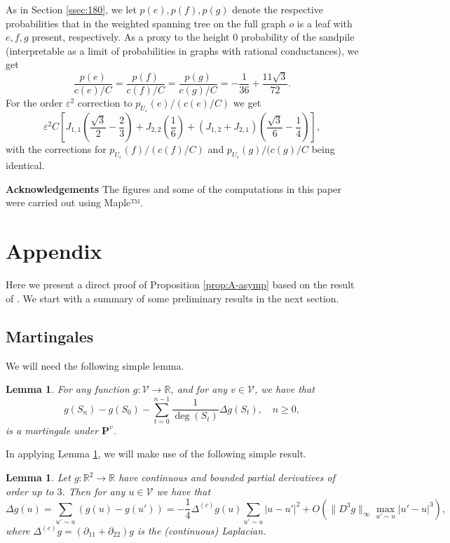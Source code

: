 \documentclass[11pt]{article}
\newtheorem{lemma}[theorem]{Lemma}
\theoremstyle{remark}
\def\eps{\varepsilon}
\def\R{\mathbb{R}}
\def\Pr{\mathbf{P}}
\def\cV{\mathcal{V}}
\newcommand{\eqnst}[1]{\begin{equation*}#1\end{equation*}}
\begin{document}
As in Section \ref{ssec:180}, we let $p(e), p(f), p(g)$ denote the respective probabilities
that in the weighted spanning tree on the full graph $o$ is a leaf with $e, f, g$ present,
respectively. As a proxy to the height $0$ probability of the sandpile (interpretable as a
limit of probabilities in graphs with rational conductances), we get
\[ \frac{p(e)}{c(e)/C}
   = \frac{p(f)}{c(f)/C}
   = \frac{p(g)}{c(g)/C}
   = -\frac{1}{36}+\frac{11 \sqrt{3}}{72}. \]
For the order $\eps^2$ correction to $p_{U_\eps}(e)/(c(e)/C)$ we get
\[  \eps^2 C \left[ J_{1,1} \left( \frac{\sqrt{3}}{2}-\frac{2}{3} \right) 
     + J_{2,2} \left( \frac{1}{6} \right) 
     + \left( J_{1,2} + J_{2,1} \right) \left( \frac{\sqrt{3}}{6}-\frac{1}{4} \right) \right], \]
with the corrections for $p_{U_\eps}(f)/(c(f)/C)$ and $p_{U_\eps}(g)/(c(g)/C$
being identical.


\textbf{Acknowledgements}
The figures and some of the computations in this paper were carried out using Maple™.


\section{Appendix}
\label{sec:appendix}

Here we present a direct proof of Proposition \ref{prop:A-asymp} based on the 
result of \cite{FU96}. We start with a summary of some preliminary results in 
the next section.

\subsection{Martingales}
\label{ssec:mart}

We will need the following simple lemma.

\begin{lemma}
\label{lem:mart}
For any function $g : \cV \to \R$, and for any $v \in \cV$, we have that
\eqnst{
  g(S_n) - g(S_0) - \sum_{t=0}^{n-1} \frac{1}{\deg(S_t)} \Delta g (S_t), \quad n \ge 0, }
is a martingale under $\Pr^v$.
\end{lemma}

In applying Lemma \ref{lem:mart}, we will make use of the following simple result.

\begin{lemma}
\label{lem:lapl}
Let $g : \R^2 \to \R$ have continuous and bounded partial derivatives of order up to $3$.
Then for any $u \in \cV$ we have that
\eqnst{
  \Delta g(u)
  = \sum_{u' \sim u} (g(u) - g(u'))
  = - \frac{1}{4} \Delta^{(c)} g (u) \sum_{u' \sim u} |u - u'|^2
    + O( \| D^3 g \|_\infty \max_{u'\sim u} |u'-u|^3 ), }
where $\Delta^{(c)} g = (\partial_{11} + \partial_{22}) g$ is the (continuous) Laplacian.
\end{lemma}
\end{document}
